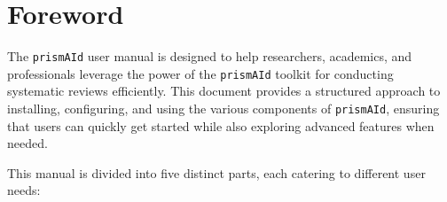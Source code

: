 \chapter*{Foreword}

The \texttt{prismAId} user manual is designed to help researchers, academics, and professionals leverage the power of the \texttt{prismAId} toolkit for conducting systematic reviews efficiently. This document provides a structured approach to installing, configuring, and using the various components of \texttt{prismAId}, ensuring that users can quickly get started while also exploring advanced features when needed.

This manual is divided into five distinct parts, each catering to different user needs:


